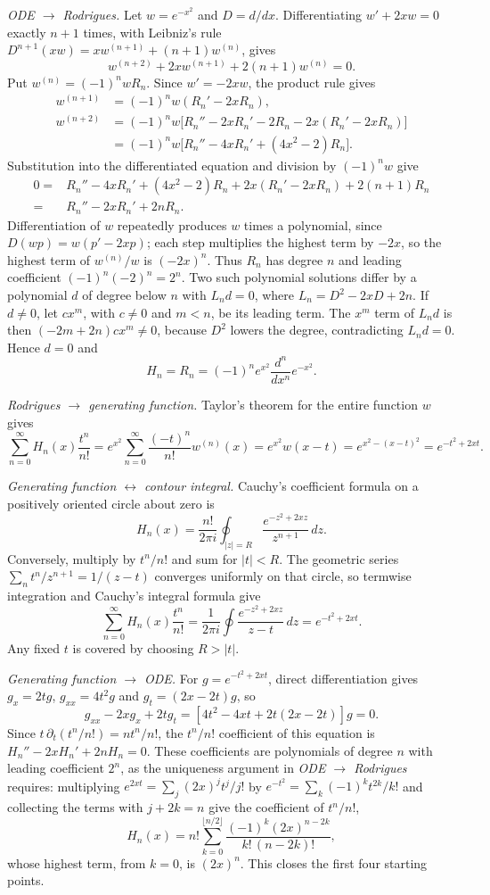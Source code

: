 \textit{ODE $\longrightarrow$ Rodrigues.}
Let $w=e^{-x^2}$ and $D=d/dx$.  Differentiating $w'+2xw=0$ exactly
$n+1$ times, with Leibniz's rule $D^{n+1}(xw)=xw^{(n+1)}+(n+1)w^{(n)}$, gives
\[
w^{(n+2)}+2xw^{(n+1)}+2(n+1)w^{(n)}=0.
\]
Put $w^{(n)}=(-1)^nwR_n$.  Since $w'=-2xw$, the product rule gives
\begin{align*}
w^{(n+1)}&=(-1)^nw(R_n'-2xR_n),\\
w^{(n+2)}&=(-1)^nw\bigl[R_n''-2xR_n'-2R_n-2x(R_n'-2xR_n)\bigr]\\
 &=(-1)^nw\bigl[R_n''-4xR_n'+(4x^2-2)R_n\bigr].
\end{align*}
Substitution into the differentiated equation and division by
$(-1)^nw$ give
\begin{align*}
0={}&R_n''-4xR_n'+(4x^2-2)R_n
       +2x(R_n'-2xR_n)+2(n+1)R_n\\
 ={}&R_n''-2xR_n'+2nR_n.
\end{align*}
Differentiation of $w$ repeatedly produces $w$ times a polynomial, since
$D(wp)=w(p'-2xp)$; each step multiplies the highest term by $-2x$, so
the highest term of $w^{(n)}/w$ is $(-2x)^n$.  Thus $R_n$ has degree $n$
and leading coefficient $(-1)^n(-2)^n=2^n$.  Two such polynomial
solutions differ by a polynomial $d$ of degree below $n$ with $L_nd=0$,
where $L_n=D^2-2xD+2n$.  If $d\ne0$, let $cx^m$, with $c\ne0$ and
$m<n$, be its leading term.  The $x^m$ term of $L_nd$ is then
$(-2m+2n)cx^m\ne0$, because $D^2$ lowers the degree, contradicting
$L_nd=0$.  Hence $d=0$ and
\[
H_n=R_n=(-1)^ne^{x^2}\frac{d^n}{dx^n}e^{-x^2}.
\]

\textit{Rodrigues $\longrightarrow$ generating function.}
Taylor's theorem for the entire function $w$ gives
\[
\sum_{n=0}^\infty H_n(x)\frac{t^n}{n!}
 =e^{x^2}\sum_{n=0}^\infty\frac{(-t)^n}{n!}w^{(n)}(x)
 =e^{x^2}w(x-t)=e^{x^2-(x-t)^2}=e^{-t^2+2xt}.
\]

\textit{Generating function $\longleftrightarrow$ contour integral.}
Cauchy's coefficient formula on a positively oriented circle about zero is
\[
H_n(x)=\frac{n!}{2\pi i}\oint_{|z|=R}
 \frac{e^{-z^2+2xz}}{z^{n+1}}\,dz.
\]
Conversely, multiply by $t^n/n!$ and sum for $|t|<R$.
The geometric series $\sum_nt^n/z^{n+1}=1/(z-t)$ converges uniformly on
that circle, so termwise integration and Cauchy's integral formula give
\[
\sum_{n=0}^\infty H_n(x)\frac{t^n}{n!}
 =\frac1{2\pi i}\oint\frac{e^{-z^2+2xz}}{z-t}\,dz
 =e^{-t^2+2xt}.
\]
Any fixed $t$ is covered by choosing $R>|t|$.

\textit{Generating function $\longrightarrow$ ODE.}
For $g=e^{-t^2+2xt}$, direct differentiation gives $g_x=2tg$,
$g_{xx}=4t^2g$ and $g_t=(2x-2t)g$, so
\[
g_{xx}-2xg_x+2tg_t
 =[4t^2-4xt+2t(2x-2t)]g=0.
\]
Since $t\,\partial_t(t^n/n!)=nt^n/n!$, the $t^n/n!$ coefficient of this
equation is $H_n''-2xH_n'+2nH_n=0$.
These coefficients are polynomials of degree $n$ with leading
coefficient $2^n$, as the uniqueness argument in
\textit{ODE $\longrightarrow$ Rodrigues} requires: multiplying
$e^{2xt}=\sum_j(2x)^jt^j/j!$ by $e^{-t^2}=\sum_k(-1)^kt^{2k}/k!$ and
collecting the terms with $j+2k=n$ give the coefficient of $t^n/n!$,
\[
H_n(x)=n!\sum_{k=0}^{\lfloor n/2\rfloor}
 \frac{(-1)^k(2x)^{n-2k}}{k!\,(n-2k)!},
\]
whose highest term, from $k=0$, is $(2x)^n$.
This closes the first four starting points.

